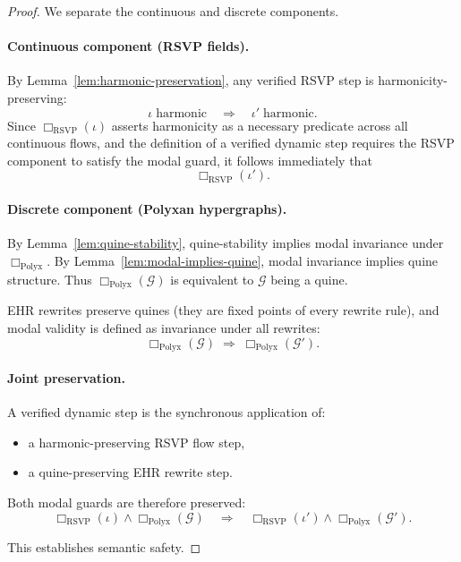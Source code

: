 \begin{proof}
We separate the continuous and discrete components.

\paragraph{Continuous component (RSVP fields).}
By Lemma~\ref{lem:harmonic-preservation}, any verified RSVP step
is harmonicity-preserving:
\[
\iota\;\text{harmonic}
\quad\Longrightarrow\quad
\iota'\;\text{harmonic}.
\]
Since $\Box_{\mathrm{RSVP}}(\iota)$ asserts harmonicity as a
necessary predicate across all continuous flows,
and the definition of a verified dynamic step requires the
RSVP component to satisfy the modal guard,
it follows immediately that
\[
\Box_{\mathrm{RSVP}}(\iota').
\]

\paragraph{Discrete component (Polyxan hypergraphs).}
By Lemma~\ref{lem:quine-stability}, quine-stability implies
modal invariance under $\Box_{\mathrm{Polyx}}$.
By Lemma~\ref{lem:modal-implies-quine}, modal invariance implies
quine structure.
Thus $\Box_{\mathrm{Polyx}}(\mathcal{G})$ is equivalent to
$\mathcal{G}$ being a quine.

EHR rewrites preserve quines 
(they are fixed points of every rewrite rule),
and modal validity is defined as invariance under all rewrites:
\[
\Box_{\mathrm{Polyx}}(\mathcal{G})
\;\Longrightarrow\;
\Box_{\mathrm{Polyx}}(\mathcal{G}').
\]

\paragraph{Joint preservation.}
A verified dynamic step is the synchronous application of:
\begin{itemize}
\item a harmonic-preserving RSVP flow step,
\item a quine-preserving EHR rewrite step.
\end{itemize}

Both modal guards are therefore preserved:
\[
\Box_{\mathrm{RSVP}}(\iota)
\land
\Box_{\mathrm{Polyx}}(\mathcal{G})
\quad\Longrightarrow\quad
\Box_{\mathrm{RSVP}}(\iota')
\land
\Box_{\mathrm{Polyx}}(\mathcal{G}').
\]

This establishes semantic safety.
\end{proof}


